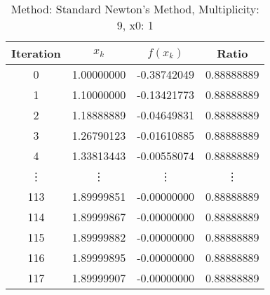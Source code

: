 \begin{table}
\centering
\caption{Method: Standard Newton's Method, Multiplicity: 9, x0: 1}
\label{tab:table_Standard_Newton's_Method_9_1}
\begin{tabular}{c c c c}
\toprule
Iteration &      $x_k$ &    $f(x_k)$ &      Ratio \\
\midrule
        0 & 1.00000000 & -0.38742049 & 0.88888889 \\
        1 & 1.10000000 & -0.13421773 & 0.88888889 \\
        2 & 1.18888889 & -0.04649831 & 0.88888889 \\
        3 & 1.26790123 & -0.01610885 & 0.88888889 \\
        4 & 1.33813443 & -0.00558074 & 0.88888889 \\
   \vdots &     \vdots &      \vdots &     \vdots \\
      113 & 1.89999851 & -0.00000000 & 0.88888889 \\
      114 & 1.89999867 & -0.00000000 & 0.88888889 \\
      115 & 1.89999882 & -0.00000000 & 0.88888889 \\
      116 & 1.89999895 & -0.00000000 & 0.88888889 \\
      117 & 1.89999907 & -0.00000000 & 0.88888889 \\
\bottomrule
\end{tabular}
\end{table}
